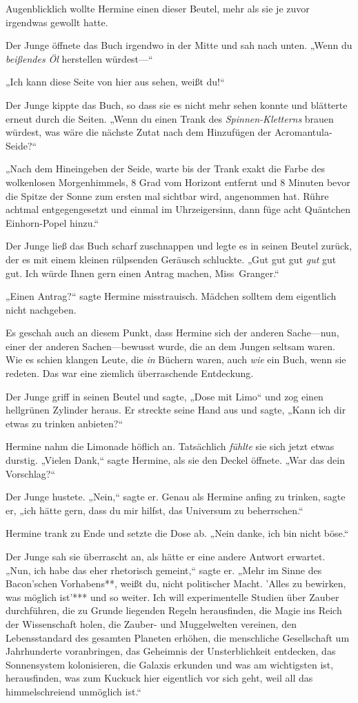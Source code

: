 {Augenblicklich wollte Hermine einen dieser Beutel, mehr als sie je zuvor irgendwas gewollt hatte.

Der Junge öffnete das Buch irgendwo in der Mitte und sah nach unten. „Wenn du \emph{beißendes Öl} herstellen würdest—“

„Ich kann diese Seite von hier aus sehen, weißt du!“

Der Junge kippte das Buch, so dass sie es nicht mehr sehen konnte und blätterte erneut durch die Seiten. „Wenn du einen Trank des \emph{Spinnen-Kletterns} brauen würdest, was wäre die nächste Zutat nach dem Hinzufügen der Acromantula-Seide?“

„Nach dem Hineingeben der Seide, warte bis der Trank exakt die Farbe des wolkenlosen Morgenhimmels, 8 Grad vom Horizont entfernt und 8 Minuten bevor die Spitze der Sonne zum ersten mal sichtbar wird, angenommen hat. Rühre achtmal entgegengesetzt und einmal im Uhrzeigersinn, dann füge acht Quäntchen Einhorn-Popel hinzu.“

Der Junge ließ das Buch scharf zuschnappen und legte es in seinen Beutel zurück, der es mit einem kleinen rülpsenden Geräusch schluckte. „Gut gut gut \emph{gut} gut gut. Ich würde Ihnen gern einen Antrag machen, Miss~Granger.“

„Einen Antrag?“ sagte Hermine misstrauisch. Mädchen solltem dem eigentlich nicht nachgeben.

Es geschah auch an diesem Punkt, dass Hermine sich der anderen Sache—nun, einer der anderen Sachen—bewusst wurde, die an dem Jungen seltsam waren. Wie es schien klangen Leute, die \emph{in} Büchern waren, auch \emph{wie} ein Buch, wenn sie redeten. Das war eine ziemlich überraschende Entdeckung.

Der Junge griff in seinen Beutel und sagte, „Dose mit Limo“ und zog einen hellgrünen Zylinder heraus. Er streckte seine Hand aus und sagte, „Kann ich dir etwas zu trinken anbieten?“

Hermine nahm die Limonade höflich an. Tatsächlich \emph{fühlte} sie sich jetzt etwas durstig. „Vielen Dank,“ sagte Hermine, als sie den Deckel öffnete. „War das dein Vorschlag?“

Der Junge hustete. „Nein,“ sagte er. Genau als Hermine anfing zu trinken, sagte er, „ich hätte gern, dass du mir hilfst, das Universum zu beherrschen.“

Hermine trank zu Ende und setzte die Dose ab. „Nein danke, ich bin nicht böse.“

Der Junge sah sie überrascht an, als hätte er eine andere Antwort erwartet. „Nun, ich habe das eher rhetorisch gemeint,“ sagte er. „Mehr im Sinne des Bacon'schen Vorhabens**, weißt du, nicht politischer Macht. 'Alles zu bewirken, was möglich ist'*** und so weiter. Ich will experimentelle Studien über Zauber durchführen, die zu Grunde liegenden Regeln herausfinden, die Magie ins Reich der Wissenschaft holen, die Zauber- und Muggelwelten vereinen, den Lebensstandard des gesamten Planeten erhöhen, die menschliche Gesellschaft um Jahrhunderte voranbringen, das Geheimnis der Unsterblichkeit entdecken, das Sonnensystem kolonisieren, die Galaxis erkunden und was am wichtigsten ist, herausfinden, was zum Kuckuck hier eigentlich vor sich geht, weil all das himmelschreiend unmöglich ist.“

}
